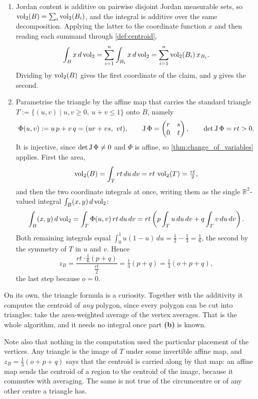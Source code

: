 \begin{exercisesolution}
\label{sol:centroid_additivity_and_triangle}
\begin{enumerate}[label=\textbf{(\alph*)}]
  \item Jordan content is additive on pairwise disjoint Jordan measurable sets, so
    $\operatorname{vol}_2(B) = \sum_i \operatorname{vol}_2(B_i)$, and the integral is additive over the same decomposition.
    Applying the latter to the coordinate function $x$ and then reading each summand through
    \cref{def:centroid},
    \[\int_B x \,d\operatorname{vol}_2 = \sum_{i=1}^n \int_{B_i} x \,d\operatorname{vol}_2
      = \sum_{i=1}^n \operatorname{vol}_2(B_i)\,x_{B_i} .\]
    Dividing by $\operatorname{vol}_2(B)$ gives the first coordinate of the claim, and $y$ gives the second.
  \item Parametrise the triangle by the affine map that carries the standard triangle
    $T := \{(u,v) \mid u,v \geq 0,\ u+v \leq 1\}$ onto $B$, namely
    \[\Phi(u,v) := u\,p + v\,q = (ur+vs,\ vt), \qquad
      \Jac\Phi = \begin{pmatrix} r & s \\ 0 & t \end{pmatrix}, \qquad
      \det\Jac\Phi = rt > 0 .\]
    It is injective, since $\det\operatorname{J}\Phi \neq 0$ and $\Phi$ is affine, so
    \cref{thm:change_of_variables} applies. First the area,
    \[\operatorname{vol}_2(B) = \int_T rt \,du\,dv = rt\,\operatorname{vol}_2(T) = \tfrac{rt}{2},\]
    and then the two coordinate integrals at once, writing them as the single
    $\mathbb{R}^2$-valued integral $\int_B (x,y)\,d\operatorname{vol}_2$:
    \[\int_B (x,y)\,d\operatorname{vol}_2 = \int_T \Phi(u,v)\,rt \,du\,dv
      = rt\left(p\int_T u \,du\,dv + q\int_T v \,du\,dv\right).\]
    Both remaining integrals equal $\int_0^1 u(1-u)\,du = \tfrac12-\tfrac13 = \tfrac16$, the
    second by the symmetry of $T$ in $u$ and $v$. Hence
    \[z_B = \frac{rt\cdot\tfrac16(p+q)}{\tfrac{rt}{2}} = \tfrac13(p+q) = \tfrac13(o+p+q),\]
    the last step because $o = 0$.
\end{enumerate}

\begin{remark}
On its own, the triangle formula is a curiosity. Together with the additivity it computes the
centroid of \emph{any} polygon, since every polygon can be cut into triangles: take the
area-weighted average of the vertex averages. That is the whole algorithm, and it needs no
integral once part \textbf{(b)} is known.

Note also that nothing in the computation used the particular placement of the vertices. Any
triangle is the image of $T$ under some invertible affine map, and $z_B = \tfrac13(o+p+q)$ says
that the centroid is carried along by that map: an affine map sends the centroid of a region
to the centroid of the image, because it commutes with averaging. The same is not true of the
circumcentre or of any other centre a triangle has.
\end{remark}
\end{exercisesolution}

